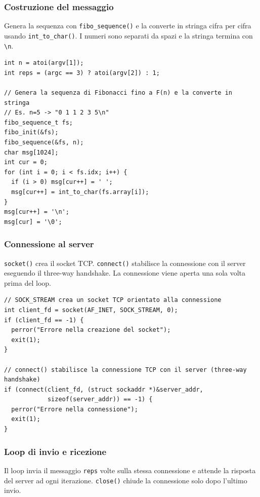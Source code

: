 \documentclass[a4paper,12pt]{article}
\begin{document}
\subsubsection{Costruzione del messaggio}
Genera la sequenza con \texttt{fibo\_sequence()} e la converte in stringa
cifra per cifra usando \texttt{int\_to\_char()}. I numeri sono separati da
spazi e la stringa termina con \texttt{\textbackslash n}.

\begin{lstlisting}[caption={client.c - costruzione messaggio}]
int n = atoi(argv[1]);
int reps = (argc == 3) ? atoi(argv[2]) : 1;

// Genera la sequenza di Fibonacci fino a F(n) e la converte in stringa
// Es. n=5 -> "0 1 1 2 3 5\n"
fibo_sequence_t fs;
fibo_init(&fs);
fibo_sequence(&fs, n);
char msg[1024];
int cur = 0;
for (int i = 0; i < fs.idx; i++) {
  if (i > 0) msg[cur++] = ' ';
  msg[cur++] = int_to_char(fs.array[i]);
}
msg[cur++] = '\n';
msg[cur] = '\0';
\end{lstlisting}
\FloatBarrier

\subsubsection{Connessione al server}
\texttt{socket()} crea il socket TCP. \texttt{connect()} stabilisce la
connessione con il server eseguendo il three-way handshake. La connessione
viene aperta una sola volta prima del loop.

\begin{lstlisting}[caption={client.c - socket() e connect()}]
// SOCK_STREAM crea un socket TCP orientato alla connessione
int client_fd = socket(AF_INET, SOCK_STREAM, 0);
if (client_fd == -1) {
  perror("Errore nella creazione del socket");
  exit(1);
}

// connect() stabilisce la connessione TCP con il server (three-way handshake)
if (connect(client_fd, (struct sockaddr *)&server_addr,
            sizeof(server_addr)) == -1) {
  perror("Errore nella connessione");
  exit(1);
}
\end{lstlisting}
\FloatBarrier

\subsubsection{Loop di invio e ricezione}
Il loop invia il messaggio \texttt{reps} volte sulla stessa connessione e
attende la risposta del server ad ogni iterazione. \texttt{close()} chiude
la connessione solo dopo l'ultimo invio.
\end{document}
